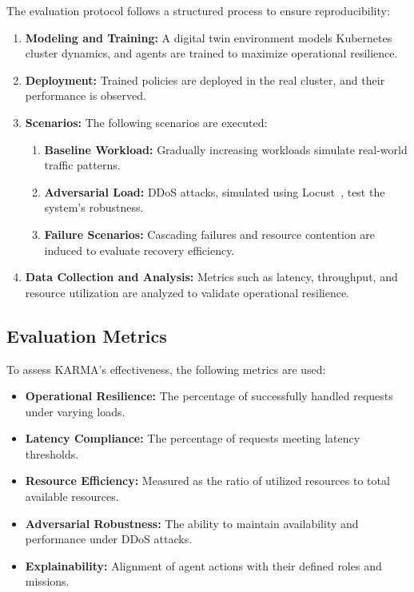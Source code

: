 \documentclass[conference]{IEEEtran}
\begin{document}
The evaluation protocol follows a structured process to ensure reproducibility:
\begin{enumerate}
    \item \textbf{Modeling and Training:} A digital twin environment models Kubernetes cluster dynamics, and agents are trained to maximize operational resilience.
    \item \textbf{Deployment:} Trained policies are deployed in the real cluster, and their performance is observed.
    \item \textbf{Scenarios:} The following scenarios are executed:
    \begin{enumerate}
        \item \textbf{Baseline Workload:} Gradually increasing workloads simulate real-world traffic patterns.
        \item \textbf{Adversarial Load:} DDoS attacks, simulated using Locust~\cite{locust2021}, test the system's robustness.
        \item \textbf{Failure Scenarios:} Cascading failures and resource contention are induced to evaluate recovery efficiency.
    \end{enumerate}
    \item \textbf{Data Collection and Analysis:} Metrics such as latency, throughput, and resource utilization are analyzed to validate operational resilience.
\end{enumerate}

\subsection{Evaluation Metrics}

To assess KARMA's effectiveness, the following metrics are used:
\begin{itemize}
    \item \textbf{Operational Resilience:} The percentage of successfully handled requests under varying loads.
    \item \textbf{Latency Compliance:} The percentage of requests meeting latency thresholds.
    \item \textbf{Resource Efficiency:} Measured as the ratio of utilized resources to total available resources.
    \item \textbf{Adversarial Robustness:} The ability to maintain availability and performance under DDoS attacks.
    \item \textbf{Explainability:} Alignment of agent actions with their defined roles and missions.
\end{itemize}
\end{document}
